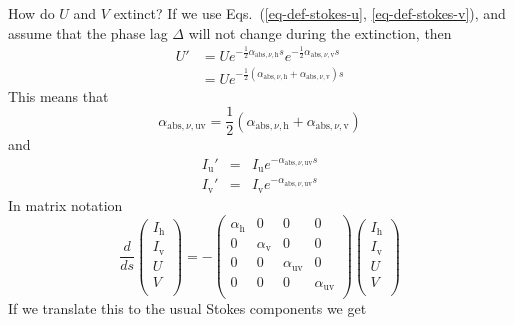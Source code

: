 \documentclass{report}
\begin{document}
How do $U$ and $V$ extinct? If we use Eqs.~(\ref{eq-def-stokes-u},
\ref{eq-def-stokes-v}), and assume that the phase lag $\Delta$ will not
change during the extinction, then 
\begin{equation}
\begin{split}
U' &= U e^{-\tfrac{1}{2}\alpha_{\mathrm{abs},\nu,\mathrm{h}}s} e^{-\tfrac{1}{2}\alpha_{\mathrm{abs},\nu,\mathrm{v}}s}\\
&=U e^{-\tfrac{1}{2}(\alpha_{\mathrm{abs},\nu,\mathrm{h}}+\alpha_{\mathrm{abs},\nu,\mathrm{v}})s}
\end{split}
\end{equation}
This means that 
\begin{equation}
\alpha_{\mathrm{abs},\nu,\mathrm{uv}} =
\frac{1}{2}\left(\alpha_{\mathrm{abs},\nu,\mathrm{h}}+\alpha_{\mathrm{abs},\nu,\mathrm{v}}\right)
\end{equation}
and
\begin{eqnarray}
I_{\mathrm{u}}' &=& I_{\mathrm{u}} e^{-\alpha_{\mathrm{abs},\nu,\mathrm{uv}}s}\\
I_{\mathrm{v}}' &=& I_{\mathrm{v}} e^{-\alpha_{\mathrm{abs},\nu,\mathrm{uv}}s}
\end{eqnarray}
In matrix notation
\begin{equation}
\frac{d}{ds}
\left(\begin{matrix}
I_{\mathrm{h}} \\
I_{\mathrm{v}} \\
U \\
V \\
\end{matrix}\right)
= - 
\left(\begin{matrix}
\alpha_{\mathrm{h}} & 0 & 0 & 0 \\
0 & \alpha_{\mathrm{v}} & 0 & 0  \\
0 & 0 & \alpha_{\mathrm{uv}} & 0 \\
0 & 0 & 0 & \alpha_{\mathrm{uv}} \\
\end{matrix}\right)
\left(\begin{matrix}
I_{\mathrm{h}} \\
I_{\mathrm{v}} \\
U \\
V \\
\end{matrix}\right)
\end{equation}
If we translate this to the usual Stokes components we get
\end{document}
